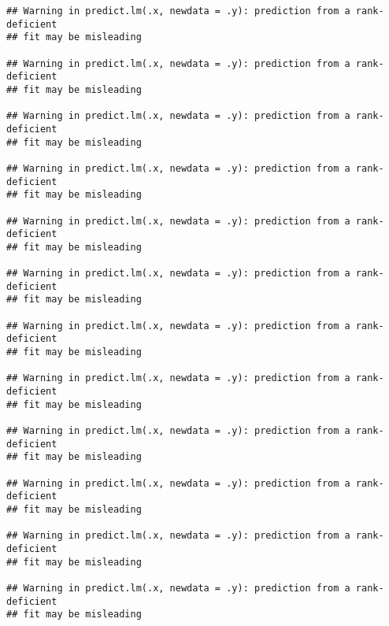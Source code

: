 \documentclass[]{article}
\begin{document}
\begin{verbatim}
## Warning in predict.lm(.x, newdata = .y): prediction from a rank-deficient
## fit may be misleading

## Warning in predict.lm(.x, newdata = .y): prediction from a rank-deficient
## fit may be misleading

## Warning in predict.lm(.x, newdata = .y): prediction from a rank-deficient
## fit may be misleading

## Warning in predict.lm(.x, newdata = .y): prediction from a rank-deficient
## fit may be misleading

## Warning in predict.lm(.x, newdata = .y): prediction from a rank-deficient
## fit may be misleading

## Warning in predict.lm(.x, newdata = .y): prediction from a rank-deficient
## fit may be misleading

## Warning in predict.lm(.x, newdata = .y): prediction from a rank-deficient
## fit may be misleading

## Warning in predict.lm(.x, newdata = .y): prediction from a rank-deficient
## fit may be misleading

## Warning in predict.lm(.x, newdata = .y): prediction from a rank-deficient
## fit may be misleading

## Warning in predict.lm(.x, newdata = .y): prediction from a rank-deficient
## fit may be misleading

## Warning in predict.lm(.x, newdata = .y): prediction from a rank-deficient
## fit may be misleading

## Warning in predict.lm(.x, newdata = .y): prediction from a rank-deficient
## fit may be misleading
\end{verbatim}
\end{document}
